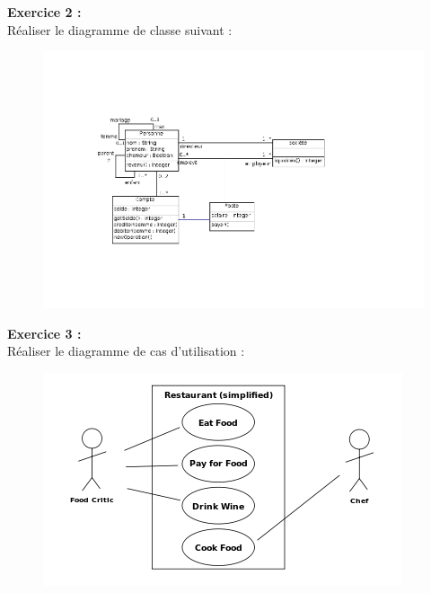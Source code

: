 \documentclass[asi, sansVersion]{picInsa}
\begin{document}
		\textbf{Exercice 2 :}\\
		Réaliser le diagramme de classe suivant : \\
		\begin{figure}[H]
			\centering
			\includegraphics[scale=0.5]{images/diagrammeDeClasse.png}
		\end{figure}
		
		\textbf{Exercice 3 :}\\
		Réaliser le diagramme de cas d'utilisation : \\
		\begin{figure}[H]
			\centering
		\includegraphics[scale=1]{images/diagrammeDeCasDUtilisation.png}
		\end{figure}
			
			\vspace{8px}
			
\end{document}
